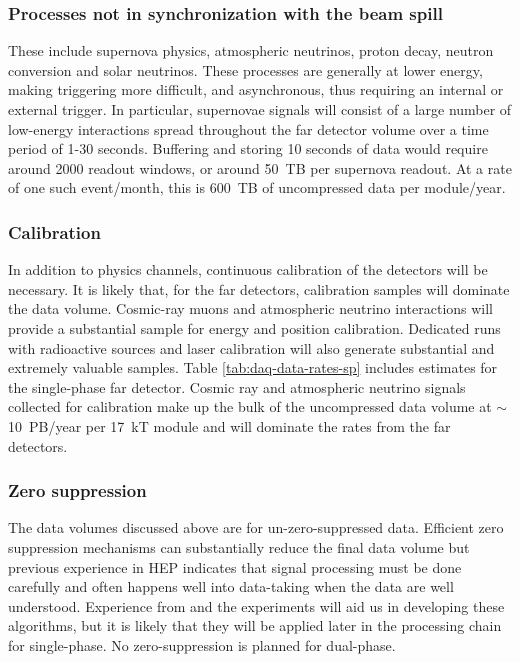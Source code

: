 \subsubsection{Processes not in synchronization with the beam spill} These include supernova physics, atmospheric neutrinos, proton decay, neutron conversion and solar neutrinos.  These processes are generally at lower energy, making triggering more difficult, and asynchronous, thus requiring an internal or external trigger.  In particular, supernovae signals will consist of a large number of low-energy interactions spread throughout the far detector volume over a time period of 1-30 seconds. Buffering and storing 10 seconds of data would require around 2000 readout windows, or around 50~TB per supernova readout.  At a rate of one such event/month, this is 600~TB of uncompressed data per module/year.

\subsubsection{
Calibration}
In addition to physics channels, continuous calibration of the detectors will be necessary.  It is likely that, for the far detectors, calibration samples will  dominate the data volume. Cosmic-ray muons and atmospheric neutrino interactions will provide a substantial sample for energy and position calibration.  Dedicated runs with radioactive sources and laser calibration will also generate substantial and extremely valuable samples. Table \ref{tab:daq-data-rates-sp} includes estimates for the single-phase far detector.   Cosmic ray and atmospheric neutrino signals collected for calibration make up the bulk of the uncompressed  data volume at $\sim$10~PB/year per 17~kT module and will dominate the rates from the far detectors.  %





\subsubsection{Zero suppression}

The data volumes discussed above are for un-zero-suppressed data.  Efficient zero suppression mechanisms can substantially reduce the final data volume but previous experience in HEP indicates that signal processing must be done carefully and often happens well into data-taking when the data are well understood.  Experience from   and the  experiments will aid us in developing these algorithms, but it is likely that they will be applied later in the processing chain for single-phase.  No zero-suppression is planned for dual-phase.

